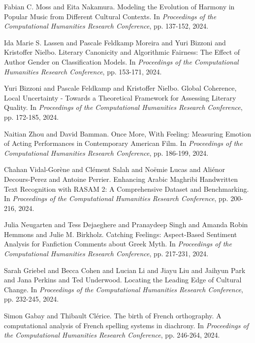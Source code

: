 \begin{thebibliography}{99}
 Fabian C. Moss and Eita Nakamura. {M}odeling the {E}volution of {H}armony in {P}opular {M}usic from {D}ifferent {C}ultural {C}ontexts. In \textit{Proceedings of the Computational Humanities Research Conference}, pp. 137-152, 2024.

 Ida Marie S. Lassen and Pascale Feldkamp Moreira and Yuri Bizzoni and Kristoffer Nielbo. {L}iterary {C}anonicity and {A}lgorithmic {F}airness: {T}he {E}ffect of {A}uthor {G}ender on {C}lassification {M}odels. In \textit{Proceedings of the Computational Humanities Research Conference}, pp. 153-171, 2024.

 Yuri Bizzoni and Pascale Feldkamp and Kristoffer Nielbo. {G}lobal {C}oherence, {L}ocal {U}ncertainty - {T}owards a {T}heoretical {F}ramework for {A}ssessing {L}iterary {Q}uality. In \textit{Proceedings of the Computational Humanities Research Conference}, pp. 172-185, 2024.

 Naitian Zhou and David Bamman. {O}nce {M}ore, {W}ith {F}eeling: {M}easuring {E}motion of {A}cting {P}erformances in {C}ontemporary {A}merican {F}ilm. In \textit{Proceedings of the Computational Humanities Research Conference}, pp. 186-199, 2024.

 Chahan Vidal-Gor{\`e}ne and Cl{\'e}ment Salah and No{\"e}mie Lucas and Ali{\'e}nor Decours-Perez and Antoine Perrier. {E}nhancing {A}rabic {M}aghribi {H}andwritten {T}ext {R}ecognition with {R}AS{A}M 2: {A} Comprehensive {D}ataset and {B}enchmarking. In \textit{Proceedings of the Computational Humanities Research Conference}, pp. 200-216, 2024.

 Julia Neugarten and Tess Dejaeghere and Pranaydeep Singh and Amanda Robin Hemmons and Julie M. Birkholz. {C}atching {F}eelings: {A}spect-{B}ased {S}entiment {A}nalysis for {F}anfiction {C}omments about {G}reek {M}yth. In \textit{Proceedings of the Computational Humanities Research Conference}, pp. 217-231, 2024.

 Sarah Griebel and Becca Cohen and Lucian Li and Jiayu Liu and Jaihyun Park and Jana Perkins and Ted Underwood. {L}ocating the {L}eading {E}dge of {C}ultural {C}hange. In \textit{Proceedings of the Computational Humanities Research Conference}, pp. 232-245, 2024.

 Simon Gabay and Thibault Cl{\'e}rice. {T}he birth of {F}rench orthography. {A} computational analysis of {F}rench spelling systems in diachrony. In \textit{Proceedings of the Computational Humanities Research Conference}, pp. 246-264, 2024.


\end{thebibliography}
